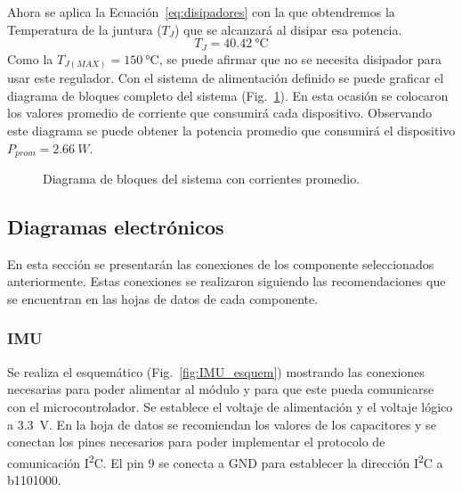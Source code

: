 Ahora se aplica la Ecuación~\ref{eq:disipadores} con la que obtendremos la Temperatura de la juntura ($T_J$) que se alcanzará al disipar esa potencia.
$$ T_J=\SI{40.42}{\celsius}$$
Como la $T_{J(MAX)}=\SI{150}{\celsius}$, se puede afirmar que no se necesita disipador para usar este regulador. Con el sistema de alimentación definido se puede graficar el diagrama de bloques completo del sistema (Fig.~\ref{fig:Bloques_comp}). En esta ocasión se colocaron los valores promedio de corriente que consumirá cada dispositivo. Observando este diagrama se puede obtener la potencia promedio que consumirá el dispositivo $P_{prom}=\SI{2.66}{W}$.

\begin{figure}[hbtp!]
\centering
{}%
\caption{Diagrama de bloques del sistema con corrientes promedio.}
\label{fig:Bloques_comp}
\end{figure}



\subsection{Diagramas electrónicos}
En esta sección se presentarán las conexiones de los componente seleccionados anteriormente. Estas conexiones se realizaron siguiendo las recomendaciones que se encuentran en las hojas de datos de cada componente.

\subsubsection{IMU}
Se realiza el esquemático (Fig.~\ref{fig:IMU_esquem}) mostrando las conexiones necesarias para poder alimentar al módulo y para que este pueda comunicarse con el microcontrolador. Se establece el voltaje de alimentación y el voltaje lógico a \SI{3.3}{V}. En la hoja de datos \cite{ICM20648} se recomiendan los valores de los capacitores y se conectan los pines necesarios para poder implementar el protocolo de comunicación I\textsuperscript{2}C. El pin 9 se conecta a GND para establecer la dirección I\textsuperscript{2}C a b1101000.

